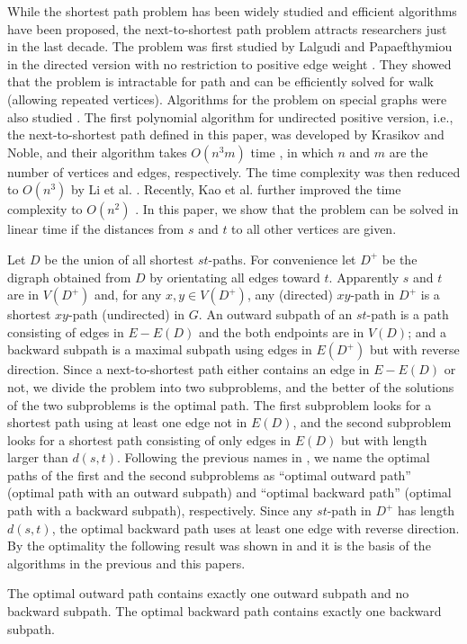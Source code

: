 While the shortest path problem has been widely studied and efficient algorithms have been proposed, the next-to-shortest path problem attracts researchers just in the last decade.
The problem was first studied by Lalgudi and Papaefthymiou in the directed version with no restriction to positive edge weight \cite{lal97}. They showed that the problem is intractable for path and can be efficiently solved for walk (allowing repeated vertices).
Algorithms for the problem on special graphs were also studied \cite{bar07,mod06}.
The first polynomial algorithm for undirected positive version, i.e., the next-to-shortest path defined in this paper,
was developed by Krasikov and Noble, and their algorithm takes $O(n^3m)$ time \cite{kra04}, in which $n$ and $m$ are the number of vertices and edges, respectively.
The time complexity was then reduced to $O(n^3)$ by Li et al. \cite{li06}.
Recently, Kao et al. further improved the time complexity to $O(n^2)$ \cite{kao10}.
In this paper, we show that the problem can be solved in linear time if the distances from $s$ and $t$ to all other vertices are given.

Let $D$ be the union of all shortest $st$-paths. 
For convenience let $D^+$ be the digraph obtained from $D$ by orientating all edges toward $t$.
Apparently $s$ and $t$ are in $V(D^+)$ and, for any $x,y\in V(D^+)$, any (directed) $xy$-path in $D^+$ is a shortest $xy$-path (undirected) in $G$.
An outward subpath of an $st$-path is a path consisting of edges in $E-E(D)$ and the both endpoints are in $V(D)$; and a backward subpath is a maximal subpath using edges in $E(D^+)$ but with reverse direction.
Since a next-to-shortest path either contains an edge in $E-E(D)$ or not, we divide the problem into two subproblems, and the better of the solutions of the two subproblems is the optimal path.
The first subproblem looks for a shortest path using at least one edge not in $E(D)$, and the second subproblem looks for a shortest path consisting of only edges in $E(D)$ but with length larger than $d(s,t)$. Following the previous names in \cite{kao10}, we name the optimal paths of the first and the second subproblems as ``optimal outward path'' (optimal path with an outward subpath) and ``optimal backward path'' (optimal path with a backward subpath), respectively. 
Since any $st$-path in $D^+$ has length $d(s,t)$, the optimal backward path uses at least one edge with reverse direction. By the optimality the following result was shown in \cite{kao10}
and it is the basis of the algorithms in the previous and this papers.
\begin{lemma}\label{c1}
The optimal outward path contains exactly one outward subpath and no backward subpath. The optimal backward path contains exactly one backward subpath.
\end{lemma}

